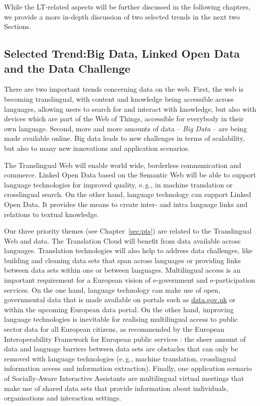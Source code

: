 \documentclass[10pt, plain]{../../metanetpaper}
\begin{document}
\begin{multicols}{2}
While the LT-related aspects will be further discussed in the following chapters, we provide a more in-depth discussion of two selected trends in the next two Sections.

\subsection[Selected Trend: Big Data, Linked Open Data and the Data Challenge]{Selected Trend:\newline Big Data, Linked Open Data and the Data Challenge}
\label{sec:linked-data-open}

There are two important trends concerning data on the web. First, the web is becoming translingual, with content and knowledge being accessible across languages, allowing users to search for and interact with knowledge, but also with devices which are part of the Web of Things, accessible for everybody in their own language. Second, more and more amounts of data -- \emph{Big Data} -- are being made available online. Big data leads to new challenges in terms of scalability, but also to many new innovations and application scenarios. 

The Translingual Web will enable world wide, borderless communication and commerce. Linked Open Data based on the Semantic Web will be able to support language technologies for improved quality, e.\,g., in machine translation or crosslingual search. On the other hand, language technology can support Linked Open Data. It provides the means to create inter- and intra language links and relations to textual knowledge.

Our three priority themes (see Chapter~\ref{sec:pts}) are related to the Translingual Web and data. The Translation Cloud will benefit from data available across languages. Translation technologies will also help to address data challenges, like building and cleaning data sets that span across languages or providing links between data sets within one or between languages. Multilingual access is an important requirement for a European vision of e-government and e-participation services. On the one hand, language technology can make use of open, governmental data that is made available on portals such as \url{data.gov.uk} or within the upcoming European data portal. On the other hand, improving language technologies is inevitable for realising multilingual access to public sector data for all European citizens, as recommended by the European Interoperability Framework for European public services \cite{EIF2010}: the sheer amount of data and language barriers between data sets are obstacles that can only be removed with language technologies (e.\,g., machine translation, crosslingual information access and information extraction). Finally, one application scenario of Socially-Aware Interactive Assistants are multilingual virtual meetings that make use of shared data sets that provide information about individuals, organisations and interaction settings. 
 

\end{multicols}
\end{document}
